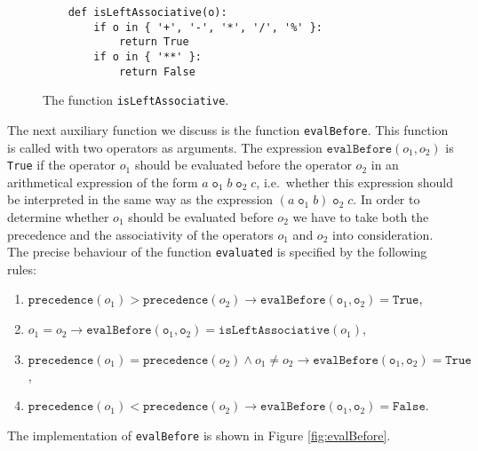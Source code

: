 \begin{figure}[!ht]
\centering
\begin{verbatim}
    def isLeftAssociative(o):
        if o in { '+', '-', '*', '/', '%' }:
            return True
        if o in { '**' }:
            return False
\end{verbatim}
\vspace*{-0.3cm}
\caption{The function \texttt{isLeftAssociative}.}
\label{fig:isLeftAssociative}
\end{figure}
The next auxiliary function we discuss is the function \texttt{evalBefore}.  This function is called with two
operators as arguments.  The expression $\texttt{evalBefore}(o_1, o_2)$ is \texttt{True}
if the operator $o_1$ should be evaluated before the operator $o_2$ in an arithmetical expression of the form
$a \;\texttt{o}_1\; b \;\texttt{o}_2\; c$, i.e.~whether this expression should be interpreted in the same way
as the expression $(a \;\texttt{o}_1\; b) \;\texttt{o}_2\; c$.  In order to determine whether $o_1$ should be
evaluated before $o_2$ we have to take both the precedence and the associativity of the operators $o_1$ and $o_2$ into
consideration.   The precise behaviour of the function \texttt{evaluated} is specified by the following rules:
\begin{enumerate}
\item $\texttt{precedence}(o_1) > \texttt{precedence}(o_2) \rightarrow 
      \texttt{evalBefore}(\texttt{o}_1, \texttt{o}_2) = \texttt{True}$,
\item $o_1 = o_2 \rightarrow \texttt{evalBefore}(\texttt{o}_1, \texttt{o}_2) = \texttt{isLeftAssociative}(o_1)$,
\item $\texttt{precedence}(o_1) = \texttt{precedence}(o_2) \wedge o_1 \not= o_2 \rightarrow 
       \texttt{evalBefore}(\texttt{o}_1, \texttt{o}_2) = \texttt{True}$,
\item $\texttt{precedence}(o_1) < \texttt{precedence}(o_2) \rightarrow 
       \texttt{evalBefore}(\texttt{o}_1, \texttt{o}_2) = \texttt{False}$.
\end{enumerate}
The implementation of \texttt{evalBefore} is shown in Figure \ref{fig:evalBefore}.

